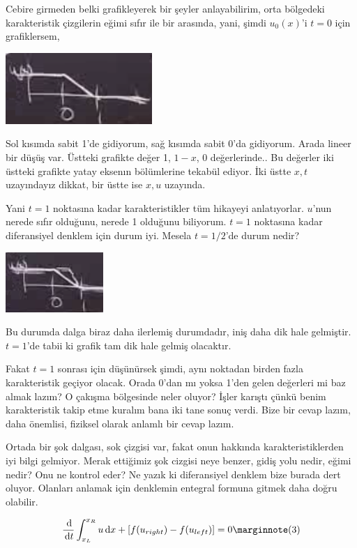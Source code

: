 \documentclass[12pt,fleqn]{article}\usepackage{../../common}
\begin{document}
Cebire girmeden belki grafikleyerek bir şeyler anlayabilirim, orta bölgedeki
karakteristik çizgilerin eğimi sıfır ile bir arasında, yani, şimdi $u_0(x)$'i
$t=0$ için grafiklersem,

\includegraphics[width=15em]{compscieng_2_08_02.png}

Sol kısımda sabit 1'de gidiyorum, sağ kısımda sabit 0'da gidiyorum. Arada
lineer bir düşüş var. Üstteki grafikte değer 1, $1-x$, 0 değerlerinde..
Bu değerler iki üstteki grafikte yatay eksenın bölümlerine tekabül ediyor.
İki üstte $x,t$ uzayındayız dikkat, bir üstte ise $x,u$ uzayında.

Yani $t=1$ noktasına kadar karakteristikler tüm hikayeyi anlatıyorlar.  $u$'nun
nerede sıfır olduğunu, nerede 1 olduğunu biliyorum. $t=1$ noktasına kadar
diferansiyel denklem için durum iyi. Mesela $t=1/2$'de durum nedir? 

\includegraphics[width=10em]{compscieng_2_08_03.png}

Bu durumda dalga biraz daha ilerlemiş durumdadır, iniş daha dik hale gelmiştir.
$t=1$'de tabii ki grafik tam dik hale gelmiş olacaktır.

Fakat $t=1$ sonrası için düşünürsek şimdi, aynı noktadan birden fazla
karakteristik geçiyor olacak. Orada 0'dan mı yoksa 1'den gelen değerleri mi baz
almak lazım? O çakışma bölgesinde neler oluyor? İşler karıştı çünkü benim
karakteristik takip etme kuralım bana iki tane sonuç verdi. Bize bir cevap
lazım, daha önemlisi, fiziksel olarak anlamlı bir cevap lazım.

Ortada bir şok dalgası, sok çizgisi var, fakat onun hakkında karakteristiklerden
iyi bilgi gelmiyor. Merak ettiğimiz şok cizgisi neye benzer, gidiş yolu nedir,
eğimi nedir? Onu ne kontrol eder? Ne yazık ki diferansiyel denklem bize burada
dert oluyor. Olanları anlamak için denklemin entegral formuna gitmek daha doğru
olabilir.

$$
\frac{\ud}{\ud t} \int_{x_L}^{x_R}
u \ud x + \left[ f(u_{right}) - f(u_{left})  \right] = 0
\mlabel{3}
$$
\end{document}
